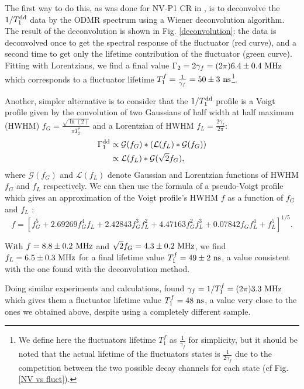 \documentclass[a4paper, 11pt]{book}
\begin{document}
The first way to do this, as was done for NV-P1 CR in \citep{hall2016detection}, is to deconvolve the $1/T_1^{\rm dd}$ data by the ODMR spectrum using a Wiener deconvolution algorithm. The result of the deconvolution is shown in Fig. \ref{deconvolution}: the data is deconvolved once to get the spectral response of the fluctuator (red curve), and a second time to get only the lifetime contribution of the fluctuator (green curve). Fitting with Lorentzians, we find a final value $\Gamma_2 =2\gamma_f= (2\pi) 6.4 \pm 0.4\ \rm MHz$ which corresponds to a fluctuator lifetime $T_1^f=\frac{1}{\gamma_f}=50 \pm 3\ \rm ns$\footnote{We define here the fluctuators lifetime $T_1^f$ as $\frac{1}{\gamma_f}$ for simplicity, but it should be noted that the actual lifetime of the fluctuators states is $\frac{1}{2\gamma_f}$ due to the competition between the two possible decay channels for each state (cf Fig. \ref{NV vs fluct}).}.

Another, simpler alternative is to consider that the $1/T_1^{\rm dd}$ profile is a Voigt profile given by the convolution of two Gaussians of half width at half maximum (HWHM) $f_G=\frac{\sqrt{\ln (2)}}{\pi T_2^*}$ and a Lorentzian of HWHM $f_L=\frac{2 \gamma_f}{2 \pi}$:
\begin{align*}
\Gamma_1^{\rm dd}&\propto \mathcal{G}(f_G)*(\mathcal{L}(f_L)*\mathcal{G}(f_G)) \\
&\propto \mathcal{L}(f_L)*\mathcal{G}(\sqrt{2} f_G),
\end{align*}
where $\mathcal{G}(f_G)$ and $\mathcal{L}(f_L)$ denote Gaussian and Lorentzian functions of HWHM $f_G$ and $f_L$ respectively.
We can then use the formula of a pseudo-Voigt profile which gives an approximation of the Voigt profile's HWHM $f$ as a function of $f_G$ and $f_L$ \citep{ida2000extended}:
\begin{equation}
f = [f_G^5 + 2.69269 f_G^4 f_L + 2.42843 f_G^3 f_L^2 + 4.47163 f_G^2 f_L^3 + 0.07842 f_G f_L^4 + f_L^5]^{1/5}.
\end{equation}

With $f=8.8 \pm 0.2\ \rm MHz$ and $\sqrt{2}f_G=4.3 \pm 0.2\ \rm MHz$, we find $f_L=6.5 \pm 0.3\ \rm MHz$ for a final lifetime value $T_1^f = 49 \pm 2\ \rm ns$, a value consistent with the one found with the deconvolution method.

Doing similar experiments and calculations, \citep{choi2017depolarization} found $\gamma_f=1/T_1^f=(2\pi) 3.3\ \rm MHz$ which gives them a fluctuator lifetime value $T_1^f = 48\ \rm ns$, a value very close to the ones we obtained above, despite using a completely different sample.
\end{document}
